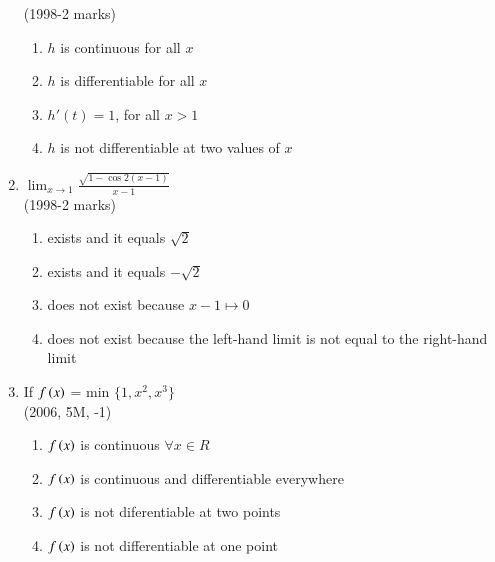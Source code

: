 \documentclass[journal,12pt,twocolumn]{IEEEtran}
\theoremstyle{remark}
\begin{document}
\begin{enumerate}
\begin{flushleft}
    \hfill
    {(1998-2 marks)}

    \begin{enumerate}[label=(\alph*)]
       
        \item $h$ is continuous for all $x$
        \item $h$ is differentiable for all $x$
        \item $h'(t)=1$, for all $x >1$
        \item $h$ is not differentiable at two values of $x$
    \end{enumerate}
\end{flushleft}

    \item
\begin{flushleft}
   
    {$\lim_{x \to1}\frac{\sqrt{1-\cos 2(x-1)}}{x-1}$} \\

    \hfill
    {(1998-2 marks)}
    \begin{enumerate}[label=(\alph*)]
       
        \item exists and it equals $\sqrt{2}$
        \item exists and it equals $-\sqrt{2}$
        \item does not exist because $x-1\mapsto 0$
        \item does not exist because the left-hand limit is not equal to the right-hand limit
    \end{enumerate}
\end{flushleft}

    \item
\begin{flushleft}
   
    {If $f\left(x\right)$ = min $\{1,x^2,x^3\}$} \\

    \hfill
    {(2006, 5M, -1)}
   
    \begin{enumerate}[label=(\alph*)]
       
        \item $f\left(x\right)$ is continuous $\forall x \in R$
        \item $f\left(x\right)$ is continuous and differentiable everywhere
        \item $f\left(x\right)$ is not diferentiable at two points
        \item $f\left(x\right)$ is not differentiable at one point
    \end{enumerate}
\end{flushleft}


\end{enumerate}
\end{document}

